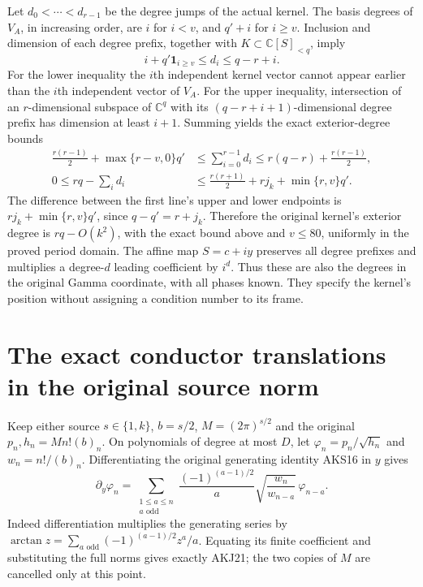 \documentclass[11pt,a4paper]{article}
\begin{document}
Let $d_0<\cdots<d_{r-1}$ be the degree jumps of the actual kernel.
The basis degrees of $V_A$, in increasing order, are $i$ for $i<v$,
and $q'+i$ for $i\ge v$. Inclusion and dimension of each degree prefix,
together with $K\subset\mathbb C[S]_{<q}$, imply
\[
 i+q'\mathbf1_{i\ge v}\le d_i\le q-r+i.
 \tag{AKJ19}
\]
For the lower inequality the $i$th independent kernel vector cannot
appear earlier than the $i$th independent vector of $V_A$. For the
upper inequality, intersection of an $r$-dimensional subspace of
$\mathbb C^q$ with its $(q-r+i+1)$-dimensional degree prefix has dimension
at least $i+1$. Summing yields the exact exterior-degree bounds
\[
 \begin{split}
 \frac{r(r-1)}2+\max\{r-v,0\}q'
 &\le\sum_{i=0}^{r-1}d_i
 \le r(q-r)+\frac{r(r-1)}2,\\
 0\le rq-\sum_i d_i
 &\le\frac{r(r+1)}2+rj_k+\min\{r,v\}q'.
 \end{split}\tag{AKJ20}
\]
The difference between the first line's upper and lower endpoints is
$rj_k+\min\{r,v\}q'$, since $q-q'=r+j_k$. Therefore the original
kernel's exterior degree is $rq-O(k^2)$, with the exact bound above
and $v\le80$, uniformly in the proved period domain. The affine map
$S=c+iy$ preserves all degree prefixes and multiplies a degree-$d$
leading coefficient by $i^d$. Thus these are also the degrees in the
original Gamma coordinate, with all phases known. They specify the
kernel's position without assigning a condition number to its frame.

\section{The exact conductor translations in the original source norm}
Keep either source $s\in\{1,k\}$, $b=s/2$, $M=(2\pi)^{s/2}$ and
the original $p_n,h_n=M n!(b)_n$. On polynomials of degree at most $D$,
let $\varphi_n=p_n/\sqrt{h_n}$ and $w_n=n!/(b)_n$.
Differentiating the original generating identity AKS16 in $y$ gives
\[
 \partial_y\varphi_n=
 \sum_{\substack{1\le a\le n\\a\text{ odd}}}
 \frac{(-1)^{(a-1)/2}}{a}
       \sqrt{\frac{w_n}{w_{n-a}}}\,\varphi_{n-a}.
 \tag{AKJ21}
\]
Indeed differentiation multiplies the generating series by
$\arctan z=\sum_{a\text{ odd}}(-1)^{(a-1)/2}z^a/a$.
Equating its finite coefficient and substituting the full norms gives
exactly AKJ21; the two copies of $M$ are cancelled only at this point.
\end{document}
